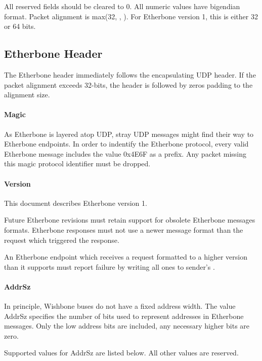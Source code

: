 \documentclass{article}
\begin{document}
All reserved fields should be cleared to 0.
All numeric values have bigendian format.
Packet alignment is max(32, , ).
For Etherbone version 1, this is either 32 or 64 bits.

\subsection{Etherbone Header}

The Etherbone header immediately follows the encapsulating UDP header.
If the packet alignment exceeds 32-bits, 
the header is followed by zeros padding to the alignment size.

\paragraph{Magic} \label{field:Magic}

As Etherbone is layered atop UDP, 
stray UDP messages might find their way to Etherbone endpoints.
In order to indentify the Etherbone protocol,
every valid Etherbone message includes the value 0x4E6F as a prefix.
Any packet missing this magic protocol identifier must be dropped.

\paragraph{Version} \label{field:Version}

This document describes Etherbone version 1.

Future Etherbone revisions must retain support for obsolete
Etherbone messages formats.
Etherbone responses must not use a newer message format than the request
which triggered the response.

An Etherbone endpoint which receives a request formatted to a higher version
than it supports must report failure by writing all ones to sender's
.

\paragraph{AddrSz} \label{field:AddrSz}

In principle, 
Wishbone buses do not have a fixed address width.
The value AddrSz specifies the number of bits used 
to represent addresses in Etherbone messages.
Only the low address bits are included,
any necessary higher bits are zero.

Supported values for AddrSz are listed below.
All other values are reserved.
\end{document}
